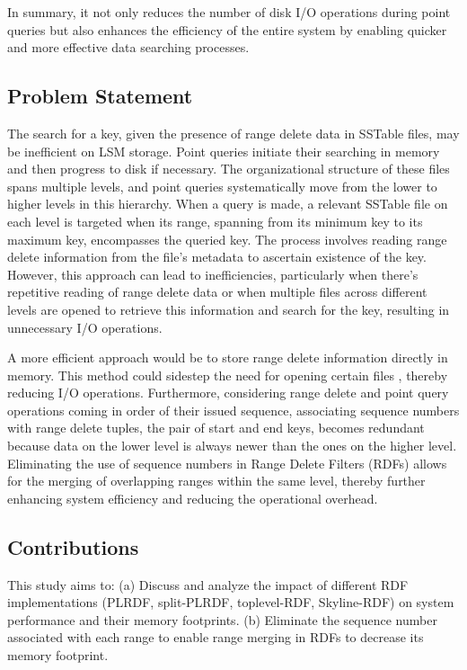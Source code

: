 In summary, it not only reduces the number of disk I/O operations during point queries but also enhances the efficiency of the entire system by enabling quicker and more effective data searching processes.

\subsection{Problem Statement}
The search for a key, given the presence of range delete data in SSTable files, may be inefficient on LSM storage. Point queries initiate their searching in memory and then progress to disk if necessary. The organizational structure of these files spans multiple levels, and point queries systematically move from the lower to higher levels in this hierarchy. When a query is made, a relevant SSTable file on each level is targeted when its range, spanning from its minimum key to its maximum key, encompasses the queried key. The process involves reading range delete information from the file's metadata to ascertain existence of the key.  However, this approach can lead to inefficiencies, particularly when there's repetitive reading of range delete data or when multiple files across different levels are opened to retrieve this information and search for the key, resulting in unnecessary I/O operations.

A more efficient approach would be to store range delete information directly in memory. This method could sidestep the need for opening certain files , thereby reducing I/O operations. Furthermore, considering range delete and point query operations coming in order of their issued sequence, associating sequence numbers with range delete tuples, the pair of start and end keys, becomes redundant because data on the lower level is always newer than the ones on the higher level.  Eliminating the use of sequence numbers in Range Delete Filters (RDFs) allows for the merging of overlapping ranges within the same level, thereby further enhancing system efficiency and reducing the operational overhead.



\subsection{Contributions}
This study aims to:
(a) Discuss and analyze the impact of different RDF implementations (PLRDF, split-PLRDF, toplevel-RDF, Skyline-RDF) on system performance and their memory footprints.
(b) Eliminate the sequence number associated with each range to enable range merging in RDFs to decrease its memory footprint. 